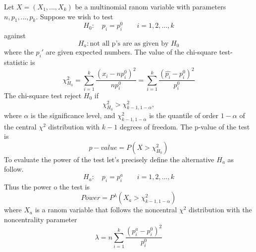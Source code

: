 \documentclass{article}
\begin{document}
Let $X=(X_1, ..., X_k)$ be a multinomial ranom variable with parameters
$n, p_1, ..., p_k$. Suppose we wish to test
\begin{equation}\label{goodness_of_fit_h_0}
    H_0: \quad p_i=p_{i}^0 \qquad i =1,2,...,k
\end{equation}
against
\begin{equation}
    H_a: \mbox{not all p's are as given by } H_0
\end{equation}
where the $p_{i}'$ are given expected numbers. The value of the chi-square test-statistic is
\begin{equation}
    \chi^2_{H_0} = \sum_{i=1}^k \frac{\left(x_i - np_{i}^0\right)^2}{np_{i}^0} = \sum_{i=1}^k \frac{\left(\widehat{p_i}  - p_{i}^0\right)^2}{p_{i}^0}
\end{equation}
The chi-square test reject $H_0$ if
\begin{equation}
    \chi^2_{H_0} > \chi^2_{k-1,1-\alpha},
\end{equation}
where $\alpha$ is the significance level, and $\chi^2_{k-1,1-\alpha}$ is the 
quantile of order $1-\alpha$ of the central $\chi^2$ distribution with $k-1$ degrees of
freedom.
The p-value of the test is
\begin{equation}
    p-value = P\left(X>\chi^2_{H_0}\right)
\end{equation}
To evaluate the power of the test let's precisely define the alternative $H_a$ as follow.
\begin{equation}\label{goodness_of_fit_h_a}
    H_a: \quad p_i=p_{i}^a \qquad i =1,2,...,k
\end{equation}
Thus the power o the test is
\begin{equation}
    Power = P^{\lambda}\left(X_a > \chi^2_{k-1,1-\alpha}\right)
\end{equation}
where $X_a$ is a ranom variable that follows the noncentral $\chi^2$ distribution with the noncentrality parameter
\begin{equation}\label{goodness_of_fit_lambda}
    \lambda = n \sum_{i=1}^k \frac{\left(p_{i}^a-p_{i}^0\right)^2}{p_{i}^0}
\end{equation}
\end{document}
